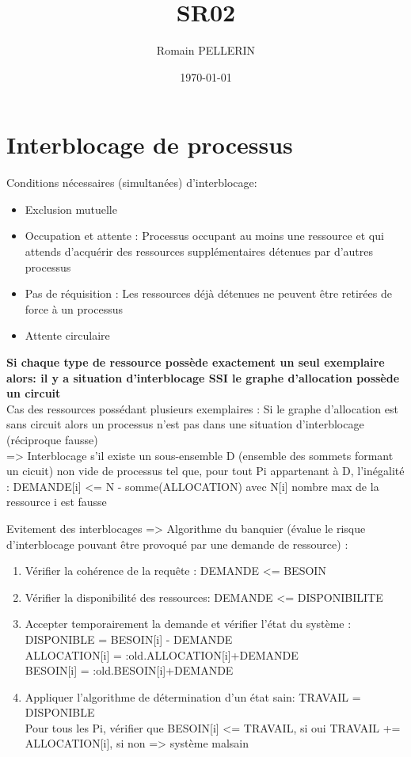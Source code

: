 \documentclass[11pt,a4paper,oneside,french,svgnames]{report}
\title{SR02}
\author{Romain PELLERIN}
\date\today
\begin{document}
\scriptsize

\section*{Interblocage de processus}

Conditions nécessaires (simultanées) d'interblocage:
\begin{itemize}
\item Exclusion mutuelle
\item Occupation et attente : Processus occupant au moins une ressource et qui attends d'acquérir des ressources supplémentaires détenues par d'autres processus
\item Pas de réquisition : Les ressources déjà détenues ne peuvent être retirées de force à un processus
\item Attente circulaire
\end{itemize}

\textbf{Si chaque type de ressource possède exactement un seul exemplaire alors: il y a situation d'interblocage SSI le graphe d'allocation possède un circuit}\\
Cas des ressources possédant plusieurs exemplaires : Si le graphe d'allocation est sans circuit alors un processus n'est pas dans une situation d'interblocage (réciproque fausse)\\
=> Interblocage s'il existe un sous-ensemble D (ensemble des sommets formant un cicuit) non vide de processus tel que, pour tout Pi appartenant à D, l'inégalité : DEMANDE[i] <= N - somme(ALLOCATION) avec N[i] nombre max de la ressource i est fausse

Evitement des interblocages => Algorithme du banquier (évalue le risque d'interblocage pouvant être provoqué par une demande de ressource) :
\begin{enumerate}
  \item Vérifier la cohérence de la requête : DEMANDE <= BESOIN
  \item Vérifier la disponibilité des ressources: DEMANDE <= DISPONIBILITE
  \item Accepter temporairement la demande et vérifier l'état du système :\\
DISPONIBLE = BESOIN[i] - DEMANDE\\
ALLOCATION[i] = :old.ALLOCATION[i]+DEMANDE\\
BESOIN[i] = :old.BESOIN[i]+DEMANDE
  \item Appliquer l'algorithme de détermination d'un état sain: TRAVAIL = DISPONIBLE\\Pour tous les Pi, vérifier que BESOIN[i] <= TRAVAIL, si oui TRAVAIL += ALLOCATION[i], si non => système malsain
\end{enumerate}
\end{document}
